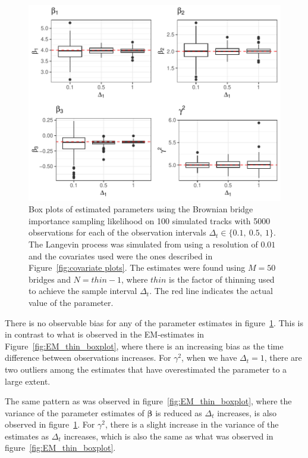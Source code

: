 \begin{figure}[H]
    \centering
    \includegraphics[width=\linewidth]{Images/Results/varying dt plot brownian bridge likelihood.pdf}
    \caption[Box plots of Parameter Estimates using Brownian bridge importance sampling at different sampling intervals]{Box plots of estimated parameters using the Brownian bridge importance sampling likelihood on 100 simulated tracks with 5000 observations for each of the observation intervals $\Delta_t \in \{0.1, \ 0.5, \ 1\}$. The Langevin process was simulated from using a resolution of $0.01$ and the covariates used were the ones described in Figure~\ref{fig:covariate plots}. The estimates were found using $M=50$ bridges and $N = thin -1$, where $thin$ is the factor of thinning used to achieve the sample interval $\Delta_t$. The red line indicates the actual value of the parameter.}
    \label{fig:varying dt boxplot BB}
\end{figure}

There is no observable bias for any of the parameter estimates in figure~\ref{fig:varying dt boxplot BB}. This is in contrast to what is observed in the EM-estimates in Figure~\ref{fig:EM_thin_boxplot}, where there is an increasing bias as the time difference between observations increases. For $\gamma^2$, when we have $\Delta_t=1$, there are two outliers among the estimates that have overestimated the parameter to a large extent. 

The same pattern as was observed in figure~\ref{fig:EM_thin_boxplot}, where the variance of the parameter estimates of $\bm \beta$ is reduced as $\Delta_t$ increases, is also observed in figure~\ref{fig:varying dt boxplot BB}. For $\gamma^2$, there is a slight increase in the variance of the estimates as $\Delta_t$ increases, which is also the same as what was observed in figure~\ref{fig:EM_thin_boxplot}.



